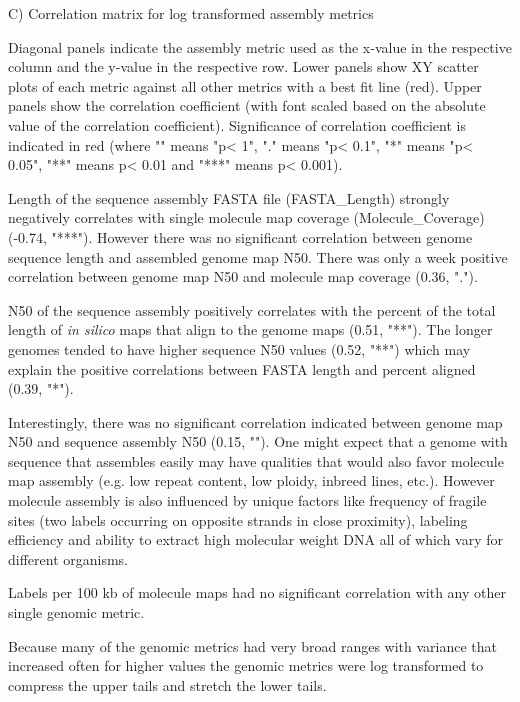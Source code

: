 C) Correlation matrix for log transformed assembly metrics

Diagonal panels indicate the assembly metric used as the x-value in the respective column and the y-value in the respective row. Lower panels show XY scatter plots of each metric against all other metrics with a best fit line (red). Upper panels show the correlation coefficient (with font scaled based on the absolute value of the correlation coefficient). Significance of correlation coefficient is indicated in red (where "" means "p< 1", "." means "p< 0.1", "*" means "p< 0.05", "**" means p< 0.01 and "***" means p< 0.001).

Length of the sequence assembly FASTA file (FASTA_Length) strongly negatively correlates with single molecule map coverage (Molecule_Coverage) (-0.74, "***"). However there was no significant correlation between genome sequence length and assembled genome map N50. There was only a week positive correlation between genome map N50 and molecule map coverage (0.36, "."). 

N50 of the sequence assembly positively correlates with the percent of the total length of \textit{in silico} maps that align to the genome maps (0.51, "**"). The longer genomes tended to have higher sequence N50 values (0.52, "**") which may explain the positive correlations between FASTA length and percent aligned (0.39, "*").

Interestingly, there was no significant correlation indicated between genome map N50 and sequence assembly N50 (0.15, ""). One might expect that a genome with sequence that assembles easily may have qualities that would also favor molecule map assembly (e.g. low repeat content, low ploidy, inbreed lines, etc.). However molecule assembly is also influenced by unique factors like frequency of fragile sites (two labels occurring on opposite strands in close proximity), labeling efficiency and ability to extract high molecular weight DNA all of which vary for different organisms.

Labels per 100 kb of molecule maps had no significant correlation with any other single genomic metric.

Because many of the genomic metrics had very broad ranges with variance that increased often for higher values the genomic metrics were log transformed to compress the upper tails and stretch the lower tails.

